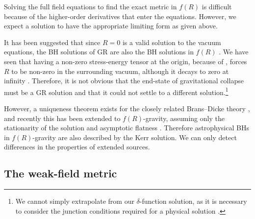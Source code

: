 Solving the full field equations to find the exact metric in $f(R)$ is difficult because of the higher-order derivatives that enter the equations. However, we expect a solution to have the appropriate limiting form as given above.

It has been suggested that since $R = 0$ is a valid solution to the vacuum equations, the BH solutions of GR are also the BH solutions in $f(R)$ \citep{Psaltis2008, Barausse2008}. We have seen that having a non-zero stress-energy tensor at the origin, because of , forces $R$ to be non-zero in the surrounding vacuum, although it decays to zero at infinity \citep{Olmo2007c}. Therefore, it is not obvious that the end-state of gravitational collapse must be a GR solution and that it could not settle to a different solution.\footnote{We cannot simply extrapolate from our $\delta$-function solution, as it is necessary to consider the junction conditions required for a physical solution \citep{Deruelle2008}.}

However, a uniqueness theorem exists for the closely related Brans--Dicke theory \citep{Hawking1972a, Bekenstein1978, Thorne1971, Scheel1995}, and recently this has been extended to $f(R)$-gravity, assuming only the stationarity of the solution and asymptotic flatness \citep{Sotiriou2011}. Therefore astrophysical BHs in $f(R)$-gravity are also described by the Kerr solution. We can only detect differences in the properties of extended sources.

\subsection{The weak-field metric}

